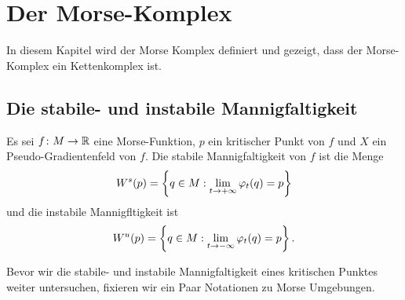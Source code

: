 \chapter{Der Morse-Komplex}

In diesem Kapitel wird der Morse Komplex definiert und gezeigt, dass der 
Morse-Komplex ein Kettenkomplex ist.

\section{Die stabile- und instabile Mannigfaltigkeit}

\begin{definition}
    \label{def: stabile und instabile mannigfaltigkeit}
    Es sei $f \colon M \to { \mathbb R }$ eine Morse-Funktion, $p$ ein kritischer Punkt von $f$ und $X$ ein
    Pseudo-Gradientenfeld von $f$. Die stabile Mannigfaltigkeit von $f$ ist die Menge
    \[ { W^s } (p) = \left\{ q \in M : \lim_{t \to + \infty} \varphi_t(q) = p \right\} \]
    und die instabile Mannigfltigkeit ist
    \[ { W^u } (p) = \left\{ q \in M : \lim_{t \to - \infty} \varphi_t(q) = p \right\} . \]
\end{definition}

Bevor wir die stabile- und instabile Mannigfaltigkeit eines kritischen Punktes weiter untersuchen, 
fixieren wir ein Paar Notationen zu Morse Umgebungen.

